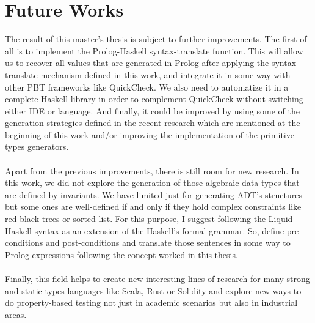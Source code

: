 \chapter{Future Works}

The result of this master's thesis is subject to further improvements. The first of all is to implement the Prolog-Haskell syntax-translate function. This will allow us to recover all values that are generated in Prolog after applying the syntax-translate mechanism defined in this work, and integrate it in some way with other PBT frameworks like QuickCheck. We also need to automatize it in a complete Haskell library in order to complement QuickCheck without switching either IDE or language. And finally, it could be improved by using some of the generation strategies defined in the recent research which are mentioned at the beginning of this work and/or improving the implementation of the primitive types generators.\\\\
Apart from the previous improvements, there is still room for new research. In this work, we did not explore the generation of those algebraic data types that are defined by invariants. We have limited just for generating ADT's structures but some ones are well-defined if and only if they hold complex constraints like red-black trees or sorted-list. For this purpose, I suggest following the Liquid-Haskell syntax as an extension of the Haskell's formal grammar. So, define pre-conditions and post-conditions and translate those sentences in some way to Prolog expressions following the concept worked in this thesis.\\\\
Finally, this field helps to create new interesting lines of research for many strong and static types languages like Scala, Rust or Solidity and explore new ways to do property-based testing not just in academic scenarios but also in industrial areas.


